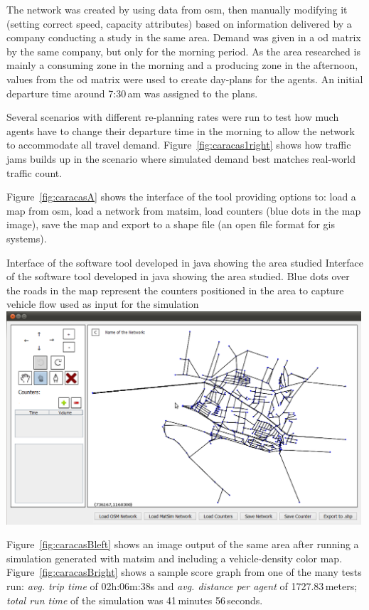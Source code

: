 The network was created by using data from \gls{osm}, then manually modifying it (\ie setting correct speed, capacity attributes) based on information delivered by a company conducting a study in the same area. Demand was given in a \gls{od} matrix by the same company, but only for the morning period. As the area researched is mainly a consuming zone in the morning and a producing zone in the afternoon, values from the \gls{od} matrix were used to create day-plans for the agents. An initial departure time around 7:30\,am was assigned to the plans.

Several scenarios with different re-planning rates were run to test how much agents have to change their departure time in the morning to allow the network to accommodate all travel demand. Figure~\ref{fig:caracas1right} shows how traffic jams builds up in the scenario where simulated demand best matches real-world traffic count.

Figure~\ref{fig:caracasA} shows the interface of the tool providing options to: load a map from \gls{osm}, load a network from \gls{matsim}, load counters (blue dots in the map image), save the map and export to a shape file (an open file format for \gls{gis} systems).

\createfigure%
{Interface of the software tool developed in \gls{java} showing the area studied}%
{Interface of the software tool developed in \gls{java} showing the area studied. Blue dots over the roads in the map represent the counters positioned in the area to capture vehicle flow used as input for the simulation}%
{\label{fig:caracasA}}%
{\includegraphics[width=0.99\textwidth, angle=0]{./scenarios/figures/caracasA.png}}%
{}

Figure~\ref{fig:caracasBleft} shows an image output of the same area after running a simulation generated with \gls{matsim} and including a vehicle-density color map. Figure~\ref{fig:caracasBright} shows a sample score graph from one of the many tests run: \emph{avg. trip time} of 02h:06m:38s and \emph{avg. distance per agent} of 1727.83\,meters; \textit{total run time} of the simulation was 41\,minutes 56\,seconds.


